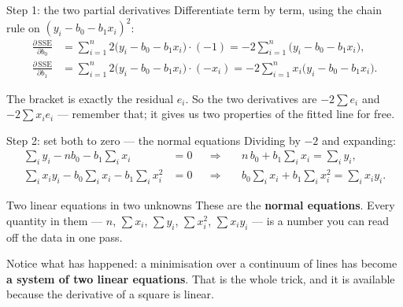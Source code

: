 \documentclass[aspectratio=169]{beamer}
\begin{document}
\begin{frame}[shrink=4]{Step 1: the two partial derivatives}
  Differentiate term by term, using the chain rule on
  $(y_i - b_0 - b_1x_i)^2$:
  \begin{align*}
    \frac{\partial\,\mathrm{SSE}}{\partial b_0}
      &= \sum_{i=1}^{n} 2\bigl(y_i - b_0 - b_1x_i\bigr)\cdot(-1)
       = -2\sum_{i=1}^{n}\bigl(y_i - b_0 - b_1x_i\bigr),\\[0.3em]
    \frac{\partial\,\mathrm{SSE}}{\partial b_1}
      &= \sum_{i=1}^{n} 2\bigl(y_i - b_0 - b_1x_i\bigr)\cdot(-x_i)
       = -2\sum_{i=1}^{n} x_i\bigl(y_i - b_0 - b_1x_i\bigr).
  \end{align*}
  \begin{center}\small
    The bracket is exactly the residual $e_i$. So the two derivatives are
    $-2\sum e_i$ and $-2\sum x_i e_i$ --- remember that; it gives us two
    properties of the fitted line for free.
  \end{center}
\end{frame}

\begin{frame}[shrink=4]{Step 2: set both to zero --- the normal equations}
  Dividing by $-2$ and expanding:
  \begin{align*}
    \sum_i y_i - n b_0 - b_1\sum_i x_i &= 0
      &&\Longrightarrow&& \;n\,b_0 + b_1\sum_i x_i = \sum_i y_i,\\
    \sum_i x_iy_i - b_0\sum_i x_i - b_1\sum_i x_i^2 &= 0
      &&\Longrightarrow&& \;b_0\sum_i x_i + b_1\sum_i x_i^2 = \sum_i x_iy_i .
  \end{align*}
  \begin{exampleblock}{Two linear equations in two unknowns}
    \centering
    These are the \textbf{normal equations}. Every quantity in them ---
    $n$, $\sum x_i$, $\sum y_i$, $\sum x_i^2$, $\sum x_iy_i$ --- is a number
    you can read off the data in one pass.
  \end{exampleblock}
  \begin{center}\small
    Notice what has happened: a minimisation over a continuum of lines has
    become \textbf{a system of two linear equations}. That is the whole
    trick, and it is available because the derivative of a square is linear.
  \end{center}
\end{frame}
\end{document}
